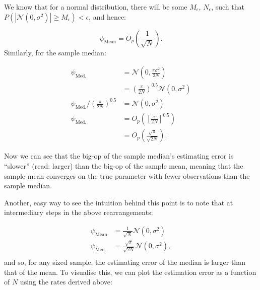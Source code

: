 \documentclass[
]{book}
\begin{document}
We know that for a normal distribution, there will be some \(M_\epsilon\), \(N_\epsilon\), such that \(P(|\mathcal{N}(0,\sigma^2)| \geq M_\epsilon) < \epsilon\), and hence:

\[\psi_\text{Mean} = O_p(\frac{1}{\sqrt{N}}).\]
Similarly, for the sample median:

\[ 
\begin{aligned}
\psi_\text{Med.} &= \mathcal{N}(0, \frac{\pi\sigma^2}{2N}) \\
&= \left( \frac{\pi}{2N}\right)^{0.5}\mathcal{N}(0,\sigma^2) \\
\psi_\text{Med.}/\left( \frac{\pi}{2N}\right)^{0.5} &= \mathcal{N}(0,\sigma^2)\\
\psi_\text{Med.} &= O_p\left( \left[\frac{\pi}{2N}\right]^{0.5}\right) \\
&= O_p\left(\frac{\sqrt{\pi}}{\sqrt{2N}}\right).
\end{aligned}
\]

Now we can see that the big-op of the sample median's estimating error is ``slower'' (read: larger) than the big-op of the sample mean, meaning that the sample mean converges on the true parameter with fewer observations than the sample median.

Another, easy way to see the intuition behind this point is to note that at intermediary steps in the above rearrangements:

\[
\begin{aligned}
\psi_\text{Mean} &= \frac{1}{\sqrt{N}}\mathcal{N}(0,\sigma^2) \\
\psi_\text{Med.} &= \frac{\sqrt{\pi}}{\sqrt{2N}}\mathcal{N}(0,\sigma^2), \\
\end{aligned}
\]
and so, for any sized sample, the estimating error of the median is larger than that of the mean. To visualise this, we can plot the estimation error as a function of \(N\) using the rates derived above:
\end{document}
